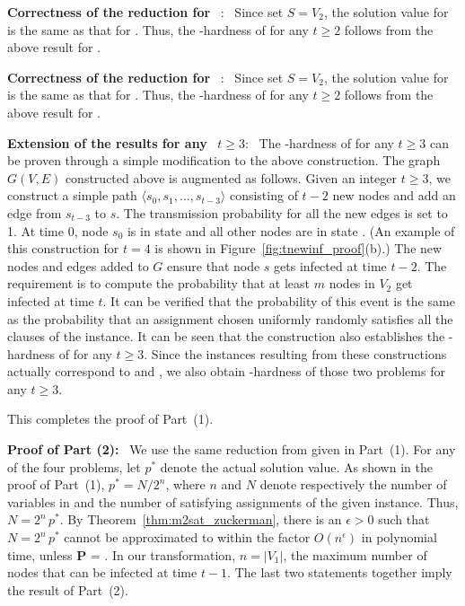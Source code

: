 \medskip
\noindent
\textbf{Correctness of the reduction for}~ \TwoVuls:~
Since set $S = V_2$, the solution value for \tVuls{} 
is the same as that for \tNewInfs.
Thus, the \cnump-hardness of \tVuls{} for any $t \geq 2$ 
follows from the above result for \tNewInfs.

\medskip
\noindent
\textbf{Correctness of the reduction for}~ \TwoTotVuls:~
Since set $S = V_2$, the solution value for \tTotVuls{} 
is the same as that for \tTotInfs.
Thus, the \cnump-hardness of \tTotVuls{} for any $t \geq 2$ 
follows from the above result for \tTotInfs.

\medskip
\noindent
\textbf{Extension of the results for any}~ $t \geq 3$:~
The \cnump-hardness of \tNewInfs{} for any $t \geq 3$ can be 
proven through a simple modification to the above construction.
The graph $G(V,E)$ constructed above is
augmented as follows.
Given an integer $t \geq 3$, we construct a simple path 
$\langle s_0, s_1, \ldots, s_{t-3}\rangle$
consisting of $t-2$ new nodes and add an edge from $s_{t-3}$ to $s$.
The transmission probability for all the new edges is set to 1.
At time 0, node $s_0$ is in state \istate{} and all 
other nodes are in state \sstate. 
(An example of this construction for $t = 4$ is shown in
Figure~\ref{fig:tnewinf_proof}(b).)
The new nodes and edges added to $G$ ensure that 
node $s$ gets infected at time $t-2$.
The requirement is to compute the probability that at least $m$
nodes in $V_2$ get infected at time $t$.  
It can be verified that the probability of this event is the
same as the probability that an assignment chosen uniformly
randomly satisfies all the clauses of the \mtsat{} instance.
It can be seen that the construction also establishes
the \cnump-hardness of \tTotInfs{} for any $t \geq 3$.
Since the instances resulting from these constructions 
actually correspond to \TwoVuls{} and \TwoTotVuls,
we also obtain \cnump-hardness of those two problems 
for any $t \geq 3$.

\medskip
This completes the proof of Part~(1).

\medskip
\noindent
\textbf{Proof of Part (2):}~ 
We use the same reduction from \mtsat{} given in Part~(1).
For any of the four problems, let $p^*$ denote the actual solution
value.
As shown in the proof of Part~(1), $p^* = N/2^n$, where $n$ and $N$
denote respectively the number of variables in and the number of satisfying
assignments of the given \mtsat{} instance.
Thus, $N = 2^n\,p^*$.
By Theorem~\ref{thm:m2sat_zuckerman}, there is an $\epsilon > 0$ such that
$N = 2^n\,p^*$ cannot be approximated to within the factor 
$O(n^{\epsilon})$ in polynomial time, unless \textbf{P} = \cnp.
In our transformation, $n = |V_1|$, the maximum number of nodes that 
can be infected at time $t-1$.
The last two statements together imply the result of Part~(2). 

